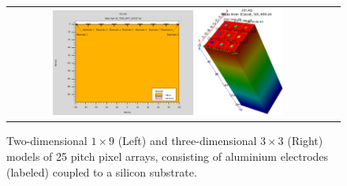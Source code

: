 \begin{figure}[!htb]
  \begin{center}
    \begin{tabular}{cc}
      \includegraphics[width=0.45\textwidth]{fig_FastTiming/Materials.png}
      \includegraphics[width=0.275\textwidth]{fig_FastTiming/Model3D.png}
    \end{tabular}
    \caption{Two-dimensional $1 \times 9$ (Left) and three-dimensional $3 \times 3$ (Right) models of \SI{25}{\micron} pitch pixel arrays, consisting of aluminium electrodes (labeled) coupled to a silicon substrate.
            }
    \label{Materials_Model}
  \end{center}
\end{figure}
